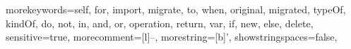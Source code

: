 {morekeywords={self, for, import, migrate, to, when, original, migrated, typeOf, kindOf, do, not, in, and, or, operation, return, var, if, new, else, delete},
sensitive=true,
morecomment=[l]{--},
morestring=[b]',
showstringspaces=false,
}